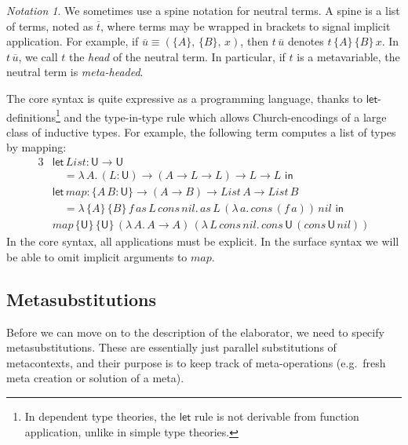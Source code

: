\documentclass[acmsmall,review,anonymous,prologue,dvipsnames]{acmart}\settopmatter{printfolios=true,printccs=false,printacmref=false}
\newcommand{\slet}{\boldsymbol{\mathsf{let}}}
\renewcommand{\sin}{\boldsymbol{\mathsf{in}}}
\renewcommand{\U}{\mathsf{U}}
\theoremstyle{remark}
\newtheorem{notation}{Notation}
\begin{document}
\begin{notation}\label{not:spines}
  We sometimes use a spine notation for neutral terms. A spine is a list of
  terms, noted as $\overline{t}$, where terms may be wrapped in brackets to
  signal implicit application. For example, if $\overline{u} \equiv
  (\{A\},\,\{B\},\,x)$, then $t\,\overline{u}$ denotes $t\,\{A\}\,\{B\}\,x$.  In
  $t\,\overline{u}$, we call $t$ the \emph{head} of the neutral term. In
  particular, if $t$ is a metavariable, the neutral term is \emph{meta-headed}.
\end{notation}

\begin{example}
The core syntax is quite expressive as a programming language, thanks to
$\slet$-definitions\footnote{In dependent type theories, the $\slet$ rule is not
  derivable from function application, unlike in simple type theories.} and the
type-in-type rule which allows Church-encodings of a large class of inductive
types. For example, the following term computes a list of types by mapping:
\begin{alignat*}{3}
  & \slet\,List : \U\to\U\\
  & \hspace{1em}= \lambda\,A.\,(L : \U)\to(A\to L\to L)\to L\to L\,\,\sin\\
  & \slet\,map : \{A\,B : \U\}\to (A \to B) \to List\,A \to List\,B\\
  & \hspace{1em}=
  \lambda\,\{A\}\,\{B\}\,f\,as\,L\,cons\,nil.\,as\,L\,(\lambda\,a.\,cons\,(f\,a))\,nil\,\,\sin\\
  & map\,\{\U\}\,\{\U\}\,(\lambda\,A.\, A \to A)\,(\lambda\,L\,cons\,nil.\,cons\,\U\,(cons\,\U\,nil))
\end{alignat*}
In the core syntax, all applications must be explicit. In the surface syntax we
will be able to omit implicit arguments to $map$.

\end{example}

\subsection{Metasubstitutions}

Before we can move on to the description of the elaborator, we need to specify
metasubstitutions. These are essentially just parallel substitutions of
metacontexts, and their purpose is to keep track of meta-operations (e.g.\ fresh
meta creation or solution of a meta).
\end{document}
